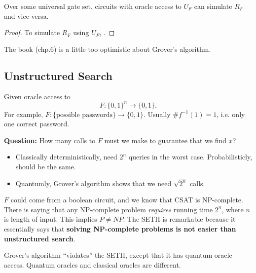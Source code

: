 
\begin{claim}
	Over some universal gate set, circuits with oracle access to $U_F$ can simulate $R_F$ and vice versa.
\end{claim}
\begin{proof} 
	To simulate $R_F$ using $U_F$,
	.

\end{proof}

\begin{remark}
	The book (chp.6) is a little too optimistic about Grover's algorithm.
\end{remark}

\subsection{Unstructured Search}

Given oracle access to
\[
	F: \{0,1\} ^n \to  \{0,1\} 
.\] 
For example, $F: \{\text{possible passwords}\}  \to  \{0,1\} $. Usually $\# f^{-1} (1) = 1$, i.e. only one correct password. 

\textbf{Question:} How many calls to $F$ must we make to guarantee that we find $x$? 
\begin{itemize}
	\item Classically deterministically, need $2^n$ queries in the worst case. Probabilisticly, should be the same. 
	\item Quantumly, Grover's algorithm shows that we need $\sqrt{2^n} $ calls.
\end{itemize}

\begin{example}
	$F$ could come from a boolean circuit, and we know that CSAT is NP-complete. There is  saying that any NP-complete problem  \textit{requires} running time $2^n$, where $n$ is length of input. This implies $P \neq NP$.
	The SETH is remarkable because it essentially says that \textbf{solving NP-complete problems is not easier than unstructured search}.

	Grover's algorithm ``violates'' the SETH, except that it has quantum oracle access. Quantum oracles and classical oracles are different.
\end{example}








